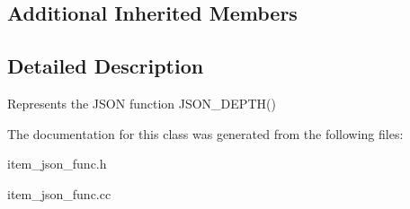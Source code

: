 \subsection*{Additional Inherited Members}


\subsection{Detailed Description}
Represents the J\+S\+ON function J\+S\+O\+N\+\_\+\+D\+E\+P\+T\+H() 

The documentation for this class was generated from the following files\+:\begin{DoxyCompactItemize}
\item 
item\+\_\+json\+\_\+func.\+h\item 
item\+\_\+json\+\_\+func.\+cc\end{DoxyCompactItemize}
